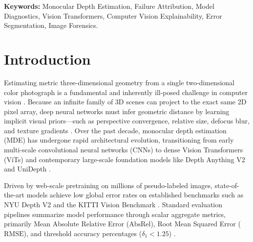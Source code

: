 \documentclass[11pt,a4paper]{article}
\begin{document}
\textbf{\small Keywords:} Monocular Depth Estimation, Failure Attribution, Model Diagnostics, Vision Transformers, Computer Vision Explainability, Error Segmentation, Image Forensics.

\newpage

\section{Introduction}
\label{sec:intro}

Estimating metric three-dimensional geometry from a single two-dimensional color photograph is a fundamental and inherently ill-posed challenge in computer vision \citep{rajapaksha2024deep,ming2020deep}. Because an infinite family of 3D scenes can project to the exact same 2D pixel array, deep neural networks must infer geometric distance by learning implicit visual priors—such as perspective convergence, relative size, defocus blur, and texture gradients \citep{eigen2014depth,bhat2021adabins}. Over the past decade, monocular depth estimation (MDE) has undergone rapid architectural evolution, transitioning from early multi-scale convolutional neural networks (CNNs) \citep{eigen2014depth,laina2016deeper} to dense Vision Transformers (ViTs) \citep{ranftl2021vision,bhat2023zoedepth} and contemporary large-scale foundation models like Depth Anything V2 \citep{yang2024depthanythingv2} and UniDepth \citep{piccinelli2024unidepth}.

Driven by web-scale pretraining on millions of pseudo-labeled images, state-of-the-art models achieve low global error rates on established benchmarks such as NYU Depth V2 \citep{silberman2012indoor} and the KITTI Vision Benchmark \citep{geiger2013vision}. Standard evaluation pipelines summarize model performance through scalar aggregate metrics, primarily Mean Absolute Relative Error ($\text{AbsRel}$), Root Mean Squared Error ($\text{RMSE}$), and threshold accuracy percentages ($\delta_1 < 1.25$) \citep{rajapaksha2024deep,spencer2022monocular}.
\end{document}
